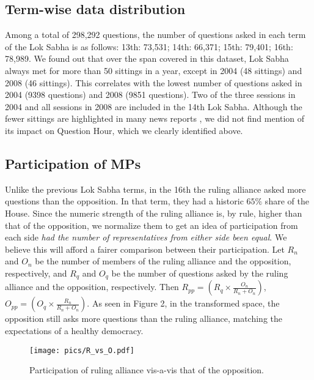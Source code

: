 \documentclass[10pt, a4paper]{article}
\begin{document}
    \subsection{Term-wise data distribution}
    Among a total of 298,292 questions, the number of questions asked in each term of the Lok Sabha is as follows: 13th: 73,531; 14th: 66,371; 15th: 79,401; 16th: 78,989. We found out that over the span covered in this dataset, Lok Sabha always met for more than 50 sittings in a year, except in 2004 (48 sittings) and 2008 (46 sittings). This correlates with the lowest number of questions asked in 2004 (9398 questions) and 2008 (9851 questions). Two of the three sessions in 2004 and all sessions in 2008 are included in the 14th Lok Sabha. Although the fewer sittings are highlighted in many news reports \cite{varma2020low}, we did not find mention of its impact on Question Hour, which we clearly identified  above.
    \subsection{Participation of MPs}
    Unlike the previous Lok Sabha terms, in the 16th  the ruling alliance asked more questions than the opposition. In that term, they had a historic $65\%$ share of the House.
    Since the numeric strength of the ruling alliance is, by rule, higher than that of the opposition, we normalize them to get an idea of participation from each side \textit{had the number of representatives from either side been equal}. 
    We believe this will afford a fairer comparison between their participation. Let $R_n$ and $O_n$ be the number of members of the ruling alliance and the opposition, respectively, and $R_q$ and $O_q$ be the number of questions asked by the ruling alliance and the opposition, respectively. Then $R_{pp} = \left( R_q \times \frac{O_n}{R_n + O_n} \right)$, $O_{pp} = \left( O_q \times \frac{R_n}{R_n + O_n}\right)$. 
    As seen in Figure 2, in the transformed space, the opposition still asks more questions than the ruling alliance,  matching the expectations of a healthy democracy. 
    
    \begin{figure}
    \centering
    \texttt{[image: pics/R\_vs\_O.pdf]}
    \captionsetup{justification=centering}
    \caption{Participation of ruling alliance vis-a-vis that of the opposition.} 
    \label{fig:EDA_RvO}
    \end{figure} 
    
\end{document}
